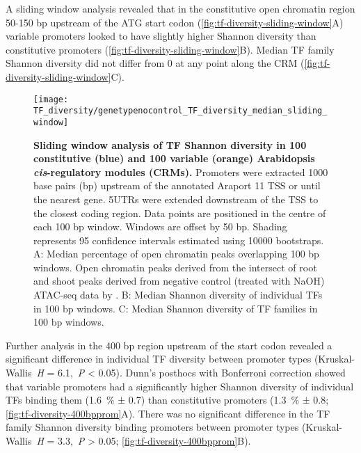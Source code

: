 \documentclass[../main.tex]{subfiles}
\begin{document}
A sliding window analysis revealed that in the constitutive open chromatin region 50-150 bp upstream of the ATG start codon (\autoref{fig:tf-diversity-sliding-window}A) variable promoters looked to have slightly higher Shannon diversity than constitutive promoters (\autoref{fig:tf-diversity-sliding-window}B). Median TF family Shannon diversity did not differ from 0 at any point along the CRM (\autoref{fig:tf-diversity-sliding-window}C).

 \begin{figure}[hbt!]
	\begin{center}
		\capstart
		\texttt{[image: TF\_diversity/genetypenocontrol\_TF\_diversity\_median\_sliding\_window]}
		\caption{
			\textbf{Sliding window analysis of TF Shannon diversity in 100 constitutive (blue) and 100 variable (orange) Arabidopsis \textit{cis}\hyp{}regulatory modules (CRMs).}
			Promoters were extracted 1000 base pairs (bp) upstream of the annotated Araport 11 \autocite{chengAraport11CompleteReannotation2017} TSS or until the nearest gene.
			5UTRs were extended downstream of the TSS to the closest coding region.
			Data points are positioned in the centre of each 100 bp window.
			Windows are offset by 50 bp.
			Shading represents 95 confidence intervals estimated using 10000 bootstraps.
			A: Median percentage of open chromatin peaks overlapping 100 bp windows. Open chromatin peaks derived from the intersect of root and shoot peaks derived from negative control (treated with NaOH) ATAC\hyp{}seq data by \textcite{potterCytokininModulatesContextdependent2018}.	
			B: Median Shannon diversity of individual TFs in 100 bp windows.
			C: Median Shannon diversity of TF families in 100 bp windows.
			\label{fig:tf-diversity-sliding-window}
		}
	\end{center}
\end{figure}

Further analysis in the 400 bp region upstream of the start codon revealed a significant difference in individual TF diversity between promoter types (Kruskal\hyp{}Wallis~\textit{H} = 6.1,~\textit{P} \textless{} 0.05).
Dunn's posthocs with Bonferroni correction showed that variable promoters had a significantly higher Shannon diversity of individual TFs binding them (\SI{1.6}{\percent} ± 0.7) than constitutive promoters (\SI{1.3}{\percent} ± 0.8; \autoref{fig:tf-diversity-400bpprom}A).
There was no significant difference in the TF family Shannon diversity binding promoters between promoter types (Kruskal\hyp{}Wallis~\textit{H} = 3.3,~\textit{P} \textgreater{} 0.05; \autoref{fig:tf-diversity-400bpprom}B).
\end{document}
